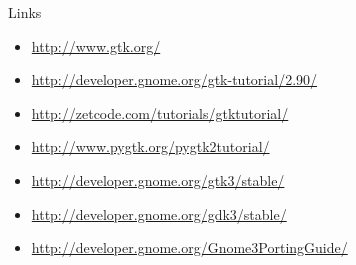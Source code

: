 \documentclass{beamer}
\begin{document}
\begin{frame}{Links}
  \begin{itemize}
    \item \url{http://www.gtk.org/}
    \item \url{http://developer.gnome.org/gtk-tutorial/2.90/}
    \item \url{http://zetcode.com/tutorials/gtktutorial/}
    \item \url{http://www.pygtk.org/pygtk2tutorial/}
    \item \url{http://developer.gnome.org/gtk3/stable/}
    \item \url{http://developer.gnome.org/gdk3/stable/}
    \item \url{http://developer.gnome.org/Gnome3PortingGuide/}
  \end{itemize}
\end{frame}
\end{document}
